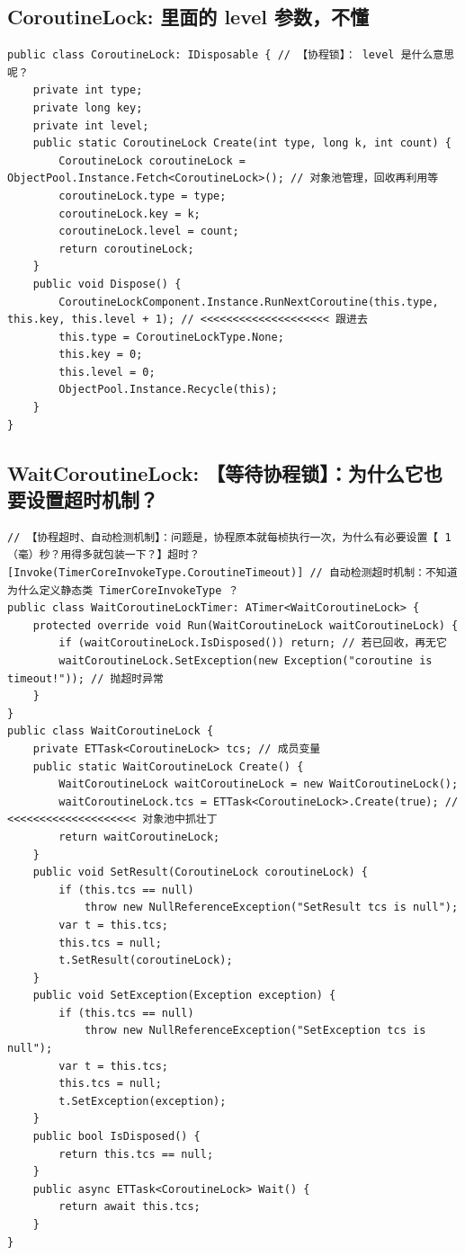 \documentclass[9pt, b5paper]{article}
\begin{document}
\subsection{CoroutineLock: 里面的 level 参数，不懂}
\label{sec-14-2}
\begin{verbatim}
public class CoroutineLock: IDisposable { // 【协程锁】： level 是什么意思呢？
    private int type;
    private long key;
    private int level;
    public static CoroutineLock Create(int type, long k, int count) {
        CoroutineLock coroutineLock = ObjectPool.Instance.Fetch<CoroutineLock>(); // 对象池管理，回收再利用等
        coroutineLock.type = type;
        coroutineLock.key = k;
        coroutineLock.level = count;
        return coroutineLock;
    }
    public void Dispose() {
        CoroutineLockComponent.Instance.RunNextCoroutine(this.type, this.key, this.level + 1); // <<<<<<<<<<<<<<<<<<<< 跟进去
        this.type = CoroutineLockType.None;
        this.key = 0;
        this.level = 0;
        ObjectPool.Instance.Recycle(this);
    }
}
\end{verbatim}
\subsection{WaitCoroutineLock: 【等待协程锁】：为什么它也要设置超时机制？}
\label{sec-14-3}
\begin{verbatim}
// 【协程超时、自动检测机制】：问题是，协程原本就每桢执行一次，为什么有必要设置【 1 （毫）秒？用得多就包装一下？】超时？
[Invoke(TimerCoreInvokeType.CoroutineTimeout)] // 自动检测超时机制：不知道为什么定义静态类 TimerCoreInvokeType ？
public class WaitCoroutineLockTimer: ATimer<WaitCoroutineLock> {
    protected override void Run(WaitCoroutineLock waitCoroutineLock) {
        if (waitCoroutineLock.IsDisposed()) return; // 若已回收，再无它
        waitCoroutineLock.SetException(new Exception("coroutine is timeout!")); // 抛超时异常
    }
}
public class WaitCoroutineLock {
    private ETTask<CoroutineLock> tcs; // 成员变量 
    public static WaitCoroutineLock Create() {
        WaitCoroutineLock waitCoroutineLock = new WaitCoroutineLock();
        waitCoroutineLock.tcs = ETTask<CoroutineLock>.Create(true); // <<<<<<<<<<<<<<<<<<<< 对象池中抓壮丁
        return waitCoroutineLock;
    }
    public void SetResult(CoroutineLock coroutineLock) {
        if (this.tcs == null) 
            throw new NullReferenceException("SetResult tcs is null");
        var t = this.tcs;
        this.tcs = null;
        t.SetResult(coroutineLock);
    }
    public void SetException(Exception exception) {
        if (this.tcs == null) 
            throw new NullReferenceException("SetException tcs is null");
        var t = this.tcs;
        this.tcs = null;
        t.SetException(exception);
    }
    public bool IsDisposed() {
        return this.tcs == null;
    }
    public async ETTask<CoroutineLock> Wait() {
        return await this.tcs;
    }
}
\end{verbatim}
\end{document}
